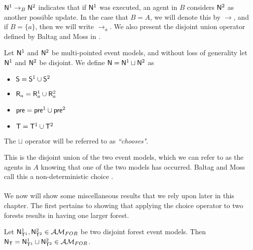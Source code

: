 $\mathrm{\mathsf{N}}^1 \to_B \mathrm{\mathsf{N}}^2$ indicates that if $\mathrm{\mathsf{N}}^1$ was executed, an agent in $B$ considers $\mathrm{\mathsf{N}}^2$ as another
possible update.
In the case that $B = A$, we will denote this by $\to$, and if $B = \{a\}$, then
we will write $\to_a$.
We also present the disjoint union operator defined by Baltag and Moss in \cite{baltag2005programs}.

\begin{defn} \label{disjoint}
Let $\mathrm{\mathsf{N}}^1$ and $\mathrm{\mathsf{N}}^2$ be multi-pointed event models, and without loss of generality let $\mathrm{\mathsf{N}}^1$ and
$\mathrm{\mathsf{N}}^2$ be disjoint.
We define $\mathrm{\mathsf{N}} = \mathrm{\mathsf{N}}^1 \sqcup \mathrm{\mathsf{N}}^2$ as
\begin{itemize}
	\item $\mathrm{\mathsf{S}} = \mathrm{\mathsf{S}}^1 \cup \mathrm{\mathsf{S}}^2$
	\item $\mathrm{\mathsf{R}}_a = \mathrm{\mathsf{R}}^1_a \cup \mathrm{\mathsf{R}}^2_a$
	\item $\mathrm{\mathsf{pre}} = \mathrm{\mathsf{pre}}^1 \cup \mathrm{\mathsf{pre}}^2$
	\item $\mathrm{\mathsf{T}} = \mathrm{\mathsf{T}}^1 \cup \mathrm{\mathsf{T}}^2$
\end{itemize}
The $\sqcup$ operator will be referred to as {\em ``chooses"}.
\end{defn}

This is the disjoint union of the two event models, which we can refer to as the agents in $A$
knowing that one of the two models has occurred.
Baltag and Moss call this a non-deterministic choice \cite{baltag2005programs}.\\
\\
We now will show some miscellaneous results that we rely upon later in this chapter.
The first pertains to showing that applying the choice operator to two forests results in having one
larger forest.

\begin{lemma} \label{disjForestIsForest}
Let $\mathrm{\mathsf{N}}^1_{\mathrm{\mathsf{T}}^1}, \mathrm{\mathsf{N}}^2_{\mathrm{\mathsf{T}}^2} \in \mathcal{AM}_{FOR}$ be two disjoint forest event models.
Then $\mathrm{\mathsf{N}}_\mathrm{\mathsf{T}} = \mathrm{\mathsf{N}}^1_{\mathrm{\mathsf{T}}^1} \sqcup \mathrm{\mathsf{N}}^2_{\mathrm{\mathsf{T}}^2} \in \mathcal{AM}_{FOR}$.
\end{lemma}

